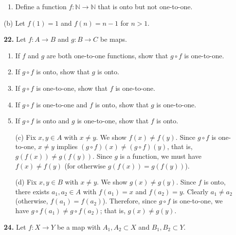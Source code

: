 \documentclass[12pt,reqno]{amsart}
\begin{document}
\begin{enumerate}[{\bf 1.}]
\begin{enumerate}
\item
Define a function $f: {\mathbb N} \rightarrow {\mathbb N}$ that is onto but not one-to-one. 
 
\end{enumerate}
\bigskip
{}
(b) Let $f(1) = 1$ and $f(n) = n-1$ for $n>1$.

\bigskip
 
\item[{\bf 22.}]
Let $f : A \rightarrow B$ and $g : B \rightarrow C$ be maps.
\begin{enumerate}
 
\item
If $f$ and $g$ are both one-to-one functions, show that $g \circ f$
is one-to-one. 
 
\item
If $g \circ f$ is onto, show that $g$ is onto.
 
\item
If $g \circ f$ is one-to-one, show that $f$ is one-to-one.
 
\item
If $g \circ f$ is one-to-one and $f$ is onto, show that $g$ is
one-to-one.
 
\item
If $g \circ f$ is onto and $g$ is one-to-one, show that $f$ is onto.
 
\end{enumerate}
\bigskip
{}
\medskip
 
\begin{enumerate}
\item[(c)] 
Fix $x, y \in A$ with $x \neq y$.  We show $f(x) \neq f(y)$.
Since $g\circ f$ is one-to-one, $x\neq y$ implies 
$(g\circ f)(x) \neq (g\circ f)(y)$, that is, 
$g(f(x)) \neq g(f(y))$.  Since $g$ is a function, 
we must have $f(x) \neq f(y)$ (for otherwise $g(f(x)) = g(f(y))$).

\medskip

\item[(d)] 
Fix $x, y \in B$ with $x\neq y$.  We show $g(x) \neq g(y)$.
Since $f$ is onto, there exists $a_1, a_2 \in A$ with 
$f(a_1) = x$ and 
$f(a_2) = y$.  Clearly $a_1 \neq a_2$ (otherwise, $f(a_1) = f(a_2)$).
Therefore, since $g\circ f$ is one-to-one, we have
$g\circ f(a_1) \neq g\circ f(a_2)$; that is, 
$g(x) \neq g(y)$.

\end{enumerate}
\bigskip

\item[{\bf 24.}]
Let $f: X \rightarrow Y$ be a map with $A_1, A_2 \subset X$ and $B_1, B_2 \subset Y$. 
\begin{enumerate}
 

\end{enumerate}
\end{enumerate}
\end{document}

